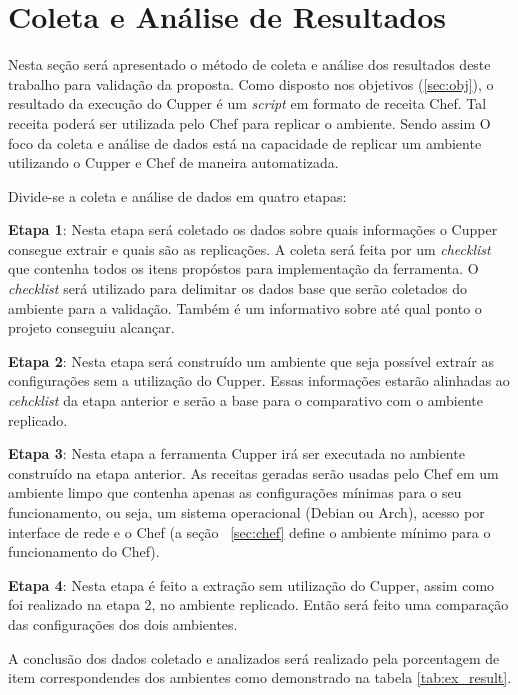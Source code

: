 \section{Coleta e Análise de Resultados}

Nesta seção será apresentado o método de coleta e análise dos resultados deste
trabalho para validação da proposta. Como disposto nos objetivos (\ref{sec:obj}),
o resultado da execução do Cupper é um \textit{script} em formato de receita Chef.
Tal receita poderá ser utilizada pelo Chef para replicar o ambiente. Sendo assim
O foco da coleta e análise de dados está na capacidade de replicar um ambiente
utilizando o Cupper e Chef de maneira automatizada.

Divide-se a coleta e análise de dados em quatro etapas:

\textbf{Etapa 1}: Nesta etapa será coletado os dados sobre quais informações o Cupper consegue
extrair e quais são as replicações. A coleta será feita por um \textit{checklist} que contenha
todos os itens propóstos para implementação da ferramenta. O \textit{checklist} será
utilizado para delimitar os dados base que serão coletados do ambiente para
a validação. Também é um informativo sobre até qual ponto o projeto conseguiu
alcançar.

\textbf{Etapa 2}: Nesta etapa será construído um ambiente que seja possível extraír as configurações
sem a utilização do Cupper. Essas informações estarão alinhadas ao \textit{cehcklist} da etapa
anterior e serão a base para o comparativo com o ambiente replicado.

\textbf{Etapa 3}: Nesta etapa a ferramenta Cupper irá ser executada no ambiente construído na etapa
anterior. As receitas geradas serão usadas pelo Chef em um ambiente limpo que contenha
apenas as configurações mínimas para o seu funcionamento, ou seja, um sistema
operacional (Debian ou Arch), acesso por interface de rede e o Chef (a seção
~\ref{sec:chef} define o ambiente mínimo para o funcionamento do Chef).

\textbf{Etapa 4}: Nesta etapa é feito a extração sem utilização do Cupper, assim como foi realizado
na etapa 2, no ambiente replicado. Então será feito uma comparação das configurações
dos dois ambientes.

A conclusão dos dados coletado e analizados será realizado pela porcentagem de
item correspondendes dos ambientes como demonstrado na tabela \ref{tab:ex_result}.


